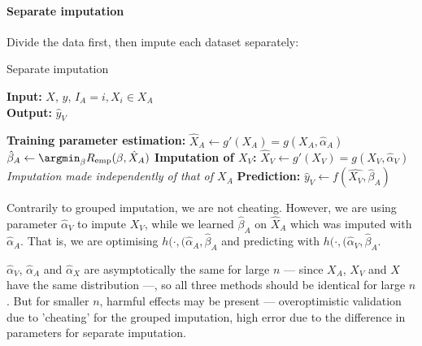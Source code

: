 \paragraph{Separate imputation}
Divide the data first, then impute each dataset separately:
\begin{algorithm}[H]
	\caption{Separate imputation}
	\hspace*{\algorithmicindent} \textbf{Input:} $X$, $y$, $I_A={i, X_i \in X_A}$  \\
 	\hspace*{\algorithmicindent} \textbf{Output:} $\hat{y}_V$
	\begin{algorithmic}[1]
		\State \textbf{Training parameter estimation:}
		\Indstate $\hat{X}_A \leftarrow g'(X_A) = g(X_A, \hat{\alpha}_A)$
		\Indstate $\hat{\beta}_A \leftarrow \argmin_{\beta} R_{\text{emp}}(\beta,\hat{X}_A)$
		\State \textbf{Imputation of $X_V$:}
		\Indstate $\hat{X}_V \leftarrow g'(X_V) = g(X_V, \hat{\alpha}_V)$ \Comment \emph{Imputation made independently of that of $X_A$}
		\State \textbf{Prediction:}
		\Indstate $\hat{y}_V \leftarrow f(\hat{X_V}, \hat{\beta}_A)$
	\end{algorithmic}
\end{algorithm}

Contrarily to grouped imputation, we are not cheating. However, we are using parameter $\hat{\alpha}_V$ to impute $X_V$, while we learned $\hat{\beta}_A$ on $\hat{X}_A$ which was imputed with $\hat{\alpha}_A$. That is, we are optimising $h(\cdot,(\hat{\alpha}_A, \hat{\beta}_A$ and predicting with  $h(\cdot,(\hat{\alpha}_V, \hat{\beta}_A$.

$\hat{\alpha}_V$, $\hat{\alpha}_A$ and $\hat{\alpha}_X$ are asymptotically the same for large $n$ --- since $X_A$, $X_V$ and $X$ have the same distribution ---, so all three methods should be identical for large $n$. But for smaller $n$, harmful effects may be present --- overoptimistic validation due to 'cheating' for the grouped imputation, high error due to the difference in parameters for separate imputation.


